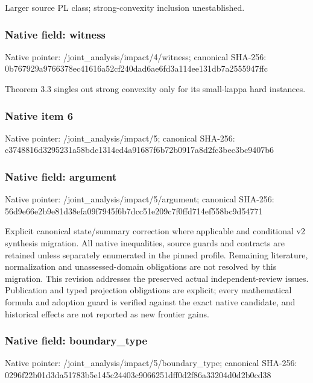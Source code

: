 \documentclass[10pt,a4paper]{article}
\begin{document}
\begingroup\raggedright\sloppy Larger source PL class;\allowbreak{} strong-convexity inclusion unestablished.\par\endgroup

\subsubsection{Native field: witness}
Native pointer: /joint\_\allowbreak{}analysis/impact/4/witness; canonical SHA-256: 0b767929a9766378ec41616a52cf240dad6ae6fd3a114ee131db7a2555947ffc

\begingroup\raggedright\sloppy Theorem 3.3 singles out strong convexity only for its small-kappa hard instances.\par\endgroup

\subsubsection{Native item 6}
Native pointer: /joint\_\allowbreak{}analysis/impact/5; canonical SHA-256: c3748816d3295231a58bdc1314cd4a91687f6b72b0917a8d2fc3bec3bc9407b6

\subsubsection{Native field: argument}
Native pointer: /joint\_\allowbreak{}analysis/impact/5/argument; canonical SHA-256: 56d9e66e2b9e81d38efa09f7945f6b7dcc51e209c7f0ffd714ef558bc9d54771

\begingroup\raggedright\sloppy Explicit canonical state/\allowbreak{}summary correction where applicable and conditional v2 synthesis migration. All native inequalities,\allowbreak{} source guards and contracts are retained unless separately enumerated in the pinned profile. Remaining literature,\allowbreak{} normalization and unassessed-domain obligations are not resolved by this migration. This revision addresses the preserved actual independent-review issues. Publication and typed projection obligations are explicit;\allowbreak{} every mathematical formula and adoption guard is verified against the exact native candidate,\allowbreak{} and historical effects are not reported as new frontier gains.\par\endgroup

\subsubsection{Native field: boundary\_\allowbreak{}type}
Native pointer: /joint\_\allowbreak{}analysis/impact/5/boundary\_\allowbreak{}type; canonical SHA-256: 0296f22b01d3da51783b5e145c24403c9066251dff0d2f86a33204d0d2b0cd38
\end{document}
